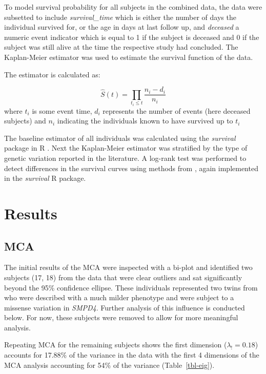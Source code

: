 \documentclass[
  authoryear,
  preprint,
  3p]{elsarticle}
\begin{document}
To model survival probability for all subjects in the combined data, the
data were subsetted to include \emph{survival\_time} which is either the
number of days the individual survived for, or the age in days at last
follow up, and \emph{deceased} a numeric event indicator which is equal
to 1 if the subject is deceased and 0 if the subject was still alive at
the time the respective study had concluded. The Kaplan-Meier estimator
\citep{kaplan1958nonparametric} was used to estimate the survival
function of the data.

The estimator is calculated as:

\[
\hat{S}(t) = \prod_{t_i \leq t}\frac{n_i - d_i}{n_i} 
\] where \(t_i\) is some event time, \(d_i\) represents the number of
events (here deceased subjects) and \(n_i\) indicating the individuals
known to have survived up to \(t_i\)

The baseline estimator of all individuals was calculated using the
\emph{survival} package in R \citep{survival-book}. Next the
Kaplan-Meier estimator was stratified by the type of genetic variation
reported in the literature. A log-rank test was performed to detect
differences in the survival curves using methods from
\citet{harrington1982class}, again implemented in the \emph{survival} R
package.

\hypertarget{results}{%
\section{Results}\label{results}}

\hypertarget{mca}{%
\subsection{MCA}\label{mca}}

The initial results of the MCA were inspected with a bi-plot and
identified two subjects (17, 18) from the data that were clear outliers
and sat significantly beyond the 95\% confidence ellipse. These
individuals represented two twins from \citet{magini2019loss} who were
described with a much milder phenotype and were subject to a missense
variation in \emph{SMPD4}. Further analysis of this influence is
conducted below. For now, these subjects were removed to allow for more
meaningful analysis.

Repeating MCA for the remaining subjects shows the first dimension
(\(\lambda_! = 0.18\)) accounts for 17.88\% of the variance in the data
with the first 4 dimensions of the MCA analysis accounting for 54\% of
the variance (Table~\ref{tbl-eig}).
\end{document}
